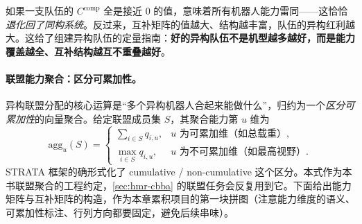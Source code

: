 \begin{insight}
如果一支队伍的 $C^{\mathrm{comp}}$ 全是接近 $0$ 的值，意味着所有机器人能力雷同——这恰恰\emph{退化回了同构系统}。反过来，互补矩阵的值越大、结构越丰富，队伍的异构红利越大。这给了组建异构队伍的定量指南：\textbf{好的异构队伍不是机型越多越好，而是能力覆盖越全、互补结构越互不重叠越好}。
\end{insight}

\paragraph{联盟能力聚合：区分可累加性。}
异构联盟分配的核心运算是“多个异构机器人合起来能做什么”，归约为一个\emph{区分可累加性}的向量聚合。给定联盟成员集 $S$，其聚合能力第 $u$ 维为
\begin{equation}
  \mathrm{agg}_u(S) =
  \begin{cases}
  \sum_{i\in S} q_{i,u}, & u\text{ 为可累加维（如总载重）},\\[4pt]
  \max_{i\in S} q_{i,u}, & u\text{ 为不可累加维（如最高视野）}. %
  \end{cases}
  \label{eq:hmr-agg}
\end{equation}
STRATA 框架的确形式化了 cumulative / non-cumulative 这个区分。本式作为本书联盟聚合的工程约定，\cref{sec:hmr-cbba} 的联盟任务会反复用到它。下面给出能力矩阵与互补矩阵的构造，作为本章累积项目的第一块拼图（注意能力维度的语义、可累加性标注、行列方向都要固定，避免后续串味）。


